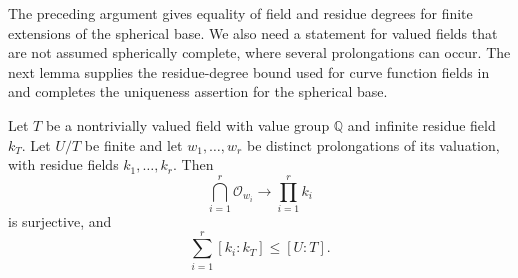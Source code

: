 The preceding argument gives equality of field and residue degrees for
finite extensions of the spherical base. We also need a statement for
valued fields that are not assumed spherically complete, where several
prolongations can occur. The next lemma supplies the residue-degree bound
used for curve function fields in  and completes
the uniqueness assertion for the spherical base.

\begin{lemma}\label{lem:simultaneous-residues}
Let $T$ be a nontrivially valued field with value group $\mathbb Q$ and
infinite residue field $k_T$.  Let $U/T$ be finite and let
$w_1,\ldots,w_r$ be distinct prolongations of its valuation, with residue
fields $k_1,\ldots,k_r$.  Then
\[
             \bigcap_{i=1}^r\mathcal O_{w_i}\longrightarrow
                         \prod_{i=1}^r k_i
\]
is surjective, and
\begin{equation}\label{eq:residue-degree-bound}
                         \sum_{i=1}^r[k_i:k_T]\leq[U:T].
\end{equation}
\end{lemma}


